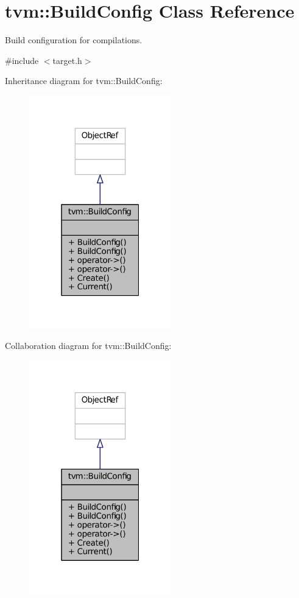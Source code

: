 \hypertarget{classtvm_1_1BuildConfig}{}\section{tvm\+:\+:Build\+Config Class Reference}
\label{classtvm_1_1BuildConfig}


Build configuration for compilations.  




{\ttfamily \#include $<$target.\+h$>$}



Inheritance diagram for tvm\+:\+:Build\+Config\+:
\nopagebreak
\begin{figure}[H]
\begin{center}
\leavevmode
\includegraphics[width=175pt]{classtvm_1_1BuildConfig__inherit__graph}
\end{center}
\end{figure}


Collaboration diagram for tvm\+:\+:Build\+Config\+:
\nopagebreak
\begin{figure}[H]
\begin{center}
\leavevmode
\includegraphics[width=175pt]{classtvm_1_1BuildConfig__coll__graph}
\end{center}
\end{figure}
